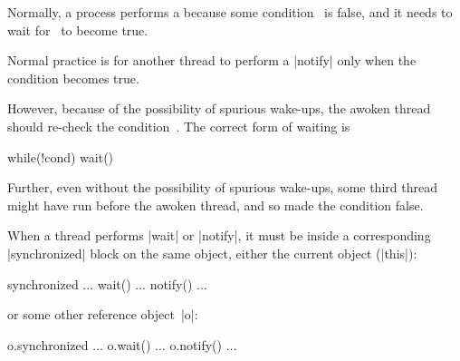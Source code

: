 
\begin{slide}

Normally, a process performs a  because some condition~
is false, and it needs to wait for~ to become true.  

Normal practice is for another thread to perform a |notify| only when the
condition becomes true.

However, because of the possibility of spurious wake-ups, the awoken thread
should re-check the  condition~.  The correct form of waiting is
%
\begin{scala}
  while(!cond) wait()
\end{scala}

Further, even without the possibility of spurious wake-ups, some third thread
might have run before the awoken thread, and so made the condition false. 

\end{slide}


\begin{slide}

When a thread performs |wait| or |notify|, it must be inside a corresponding
|synchronized| block on the same object, either the current object (|this|):
\begin{scala}
synchronized{ ... wait() ... notify() ... }
\end{scala}
%
or some other reference object~|o|:
\begin{scala}
o.synchronized{ ... o.wait() ... o.notify() ... }
\end{scala}
\end{slide}



